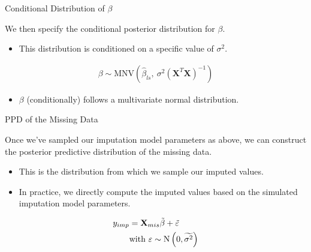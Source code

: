 \documentclass[table]{beamer}
\begin{document}
\begin{frame}{Conditional Distribution of $\beta$}

  We then specify the conditional posterior distribution for $\beta$. 
  \begin{itemize}
  \item This distribution is conditioned on a specific value of $\sigma^2$.
  \end{itemize}
  \begin{align}
    \beta \sim \text{MNV} \left( \hat{\beta}_{ls}, ~ \sigma^2 (\mathbf{X}^T \mathbf{X})^{-1} \right) \label{betaPosteriorEq}
  \end{align}
  \begin{itemize}
  \item $\beta$ (conditionally) follows a multivariate normal distribution.
  \end{itemize}

\end{frame}


\begin{frame}{PPD of the Missing Data}
  
  Once we've sampled our imputation model parameters as above, we can
  construct the posterior predictive distribution of the missing data.
  \begin{itemize}
    \item This is the distribution from which we sample our imputed
      values.
    \item In practice, we directly compute the imputed values based on
      the simulated imputation model parameters.
  \end{itemize}
  \begin{align}
    y_{imp} &= \mathbf{X}_{mis}\tilde{\beta} + \tilde{\varepsilon} \label{impPosteriorEq}\\
    &\text{with } \varepsilon \sim \text{N} \left( 0, \widetilde{\sigma^2} \right) \notag
  \end{align}
  
\end{frame}
\end{document}
